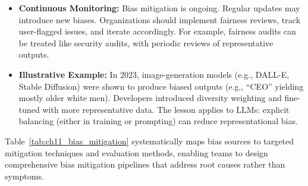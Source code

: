 \begin{itemize}
    \item \textbf{Continuous Monitoring:} Bias mitigation is ongoing. Regular updates may introduce new biases. Organizations should implement fairness reviews, track user-flagged issues, and iterate accordingly. For example, fairness audits can be treated like security audits, with periodic reviews of representative outputs.

    \item \textbf{Illustrative Example:} In 2023, image-generation models (e.g., DALL-E, Stable Diffusion) were shown to produce biased outputs (e.g., ``CEO'' yielding mostly older white men). Developers introduced diversity weighting and fine-tuned with more representative data. The lesson applies to LLMs: explicit balancing (either in training or prompting) can reduce representational bias.
\end{itemize}

Table~\ref{tab:ch11_bias_mitigation} systematically maps bias sources to targeted mitigation techniques and evaluation methods, enabling teams to design comprehensive bias mitigation pipelines that address root causes rather than symptoms.

